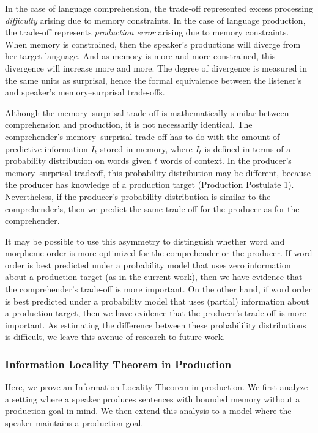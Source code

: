 \documentclass[11pt,letterpaper]{article}
\begin{document}
In the case of language comprehension, the trade-off represented excess processing \emph{difficulty} arising due to memory constraints. In the case of language production, the trade-off represents \emph{production error} arising due to memory constraints. When memory is constrained, then the speaker's productions will diverge from her target language. And as memory is more and more constrained, this divergence will increase more and more. The degree of divergence is measured in the same units as surprisal, hence the formal equivalence between the listener's and speaker's memory--surprisal trade-offs. 

Although the memory--surprisal trade-off is mathematically similar between comprehension and production, it is not necessarily identical. The comprehender's memory--surprisal trade-off has to do with the amount of predictive information $I_t$ stored in memory, where $I_t$ is defined in terms of a probability distribution on words given $t$ words of context. In the producer's memory--surprisal tradeoff, this probability distribution may be different, because the producer has knowledge of a production target (Production Postulate 1). Nevertheless, if the producer's probability distribution is similar to the comprehender's, then we predict the same trade-off for the producer as for the comprehender.

It may be possible to use this asymmetry to distinguish whether word and morpheme order is more optimized for the comprehender or the producer. If word order is best predicted under a probability model that uses zero information about a production target (as in the current work), then we have evidence that the comprehender's trade-off is more important. On the other hand, if word order is best predicted under a probability model that uses (partial) information about a production target, then we have evidence that the producer's trade-off is more important. As estimating the difference between these probabilility distributions is difficult, we leave this avenue of research to future work.


\subsubsection{Information Locality Theorem in Production}\label{sec:proof-prod}

Here, we prove an Information Locality Theorem in production.
We first analyze a setting where a speaker produces sentences with bounded memory without a production goal in mind.
We then extend this analysis to a model where the speaker maintains a production goal.
\end{document}
